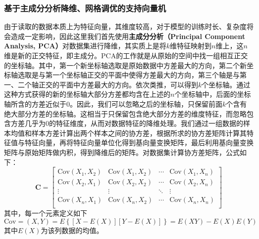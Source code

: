 \documentclass{MathorCupmodeling}
\begin{document}
	\subsubsection{基于主成分分析降维、网格调优的支持向量机}
	由于读取的数据本质上为特征向量，其维度较高，对于模型的训练时长、复杂度将会造成一定影响，因此这里我们首先使用\textbf{主成分分析（Principal Component Analysis, PCA）}对数据集进行降维，其实质上是将$k$维特征映射到$n$维上，这$n$维是新的正交特征，即主成分。PCA的工作就是从原始的空间中找一组相互正交的坐标轴。其中，第一个新坐标轴选取是原始数据中方差最大的方向，第二个新坐标轴选取是与第一个坐标轴正交的平面中使得方差最大的方向，第三个轴是与第一、二个轴正交的平面中方差最大的方向。依次类推，可以得到$k$个坐标轴。通过这种方式获得的新的坐标轴大部分方差都均含在上述的$n$个坐标轴中，后面的坐标轴所含的方差近似于$0$。因此，我们可以忽略之后的坐标轴，只保留前面$k$个含有绝大部分方差的坐标轴。这相当于只保留包含绝大部分方差的维度特征，而忽略包含方差几乎为$0$的特征维度，从而对数据特征的降维处理。我们通过一组数据的样本均值和样本方差计算出两个样本之间的协方差，根据所求的协方差矩阵计算其特征值与特征向量，再将特征向量单位化得到基向量变换矩阵，最后利用基向量变换矩阵与原始矩阵做内积，得到降维后的矩阵。对数据集计算协方差矩阵，公式如下：
	\begin{equation}
		\boldsymbol{C}=\left[ \begin{matrix}
			\text{Cov}\left( X_1,X_2 \right)&		\text{Cov}\left( X_1,X_2 \right)&		\cdots&		\text{Cov}\left( X_1,X_n \right)\\
			\text{Cov}\left( X_2,X_1 \right)&		\text{Cov}\left( X_2,X_2 \right)&		\cdots&		\text{Cov}\left( X_2,X_n \right)\\
			\vdots&		\vdots&		\ddots&		\vdots\\
			\text{Cov}\left( X_n,X_1 \right)&		\text{Cov}\left( X_n,X_2 \right)&		\cdots&		\text{Cov}\left( X_n,X_n \right)\\
		\end{matrix} \right] \label{C}
	\end{equation}
	其中，每一个元素定义如下\textcolor{blue}{\cite{刘建新}}
	\begin{equation}
		\text{Cov}=\left( X,Y \right)=E\left\{\left[X-E\left(X\right)\right]\left[Y-E\left(X\right)\right]\right\}=E\left(XY\right)-E\left(X\right)E\left(Y\right) \label{Cov}
	\end{equation}
	其中$E\left(X\right)$为该列数据的均值。
\end{document}
